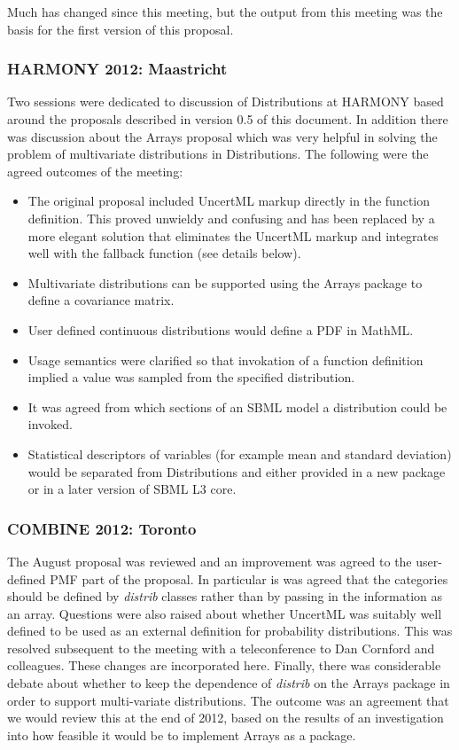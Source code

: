 \documentclass[draftspec]{sbmlpkgspec}
\newcommand{\arrays}{Arrays\xspace}
\newcommand{\distribshort}{\emph{distrib}\xspace}
\newcommand{\distrib}{Distributions\xspace}
\newcommand{\mathml}{MathML\xspace}
\newcommand{\uncertml}{UncertML\xspace}
\begin{document}
Much has changed since this meeting, but the output from this meeting
was the basis for the first version of this proposal.


\subsubsection{HARMONY 2012: Maastricht}

Two sessions were dedicated to discussion of \distrib at HARMONY based
around the proposals described in version 0.5 of this document. In
addition there was discussion about the \arrays proposal which was
very helpful in solving the problem of multivariate distributions in
\distrib. The following were the agreed outcomes of the meeting:

\begin{itemize}
\item The original proposal included UncertML markup directly in the
  function definition. This proved unwieldy and confusing and has been
  replaced by a more elegant solution that eliminates the UncertML
  markup and integrates well with the fallback function (see details
  below).
\item Multivariate distributions can be supported using the \arrays
  package to define a covariance matrix.
\item User defined continuous distributions would define a PDF in
  \mathml.
\item Usage semantics were clarified so that invokation of a function
  definition implied a value was sampled from the specified
  distribution.
\item It was agreed from which sections of an SBML model a
  distribution could be invoked.
\item Statistical descriptors of variables (for
  example mean and standard deviation) would be separated from
  \distrib and either provided in a new package or in a later version
  of SBML L3 core.
\end{itemize}

\subsubsection{COMBINE 2012: Toronto}

The August proposal was reviewed and an improvement was agreed to
the user-defined PMF part of the proposal. In particular is was agreed
that the categories should be defined by \distribshort classes rather
than by passing in the information as an array. Questions were also raised
about whether \uncertml was suitably well defined to be used as an
external definition for probability distributions. This was resolved
subsequent to the meeting with a teleconference to Dan Cornford and
colleagues. These changes are incorporated here. Finally, there was
considerable debate about whether to keep the dependence of
\distribshort on the Arrays package in order to support multi-variate
distributions. The outcome was an agreement that we would review this
at the end of 2012, based on the results of an investigation
into how feasible it would be to implement \arrays as a package.
\end{document}
